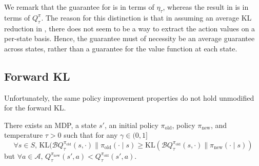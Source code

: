 \documentclass[twoside,11pt]{article}
\newcommand{\actionspace}{\mathcal{A}}
\newcommand{\KL}{\mathrm{KL}}
\newcommand{\boltzmannQ}{\mathcal{B}Q}
\newcommand{\pinew}{{\pi_\mathrm{new}}}
\newcommand{\piold}{{\pi_\mathrm{old}}}
\begin{document}
We remark that the guarantee for  is in terms of $\eta_\tau$, whereas the result in  is in terms of $Q^\pi_\tau$. The reason for this distinction is that in assuming an average KL reduction in , there does not seem to be a way to extract the action values on a per-state basis. Hence, the guarantee must of necessity be an average guarantee across states, rather than a guarantee for the value function at each state. 



\subsection{Forward KL}
Unfortunately, the same policy improvement properties do not hold unmodified for the forward KL. 
\begin{proposition}\label{lem:forward-kl-counterexample}
There exists an MDP, a state $s'$, an initial policy $\piold$, policy $\pinew$, and temperature $\tau > 0$ such that for any $\gamma \in (0, 1]$
\begin{equation*}
    \forall s \in S,\, \KL(\boltzmannQ_\tau^\piold(s, \cdot) \parallel \piold(\cdot \mid s) \geq \KL(\boltzmannQ_\tau^\piold(s, \cdot) \parallel \pinew(\cdot \mid s))
    \end{equation*}
but $\forall a \in \actionspace, \, Q_\tau^\pinew(s', a) < Q_\tau^\piold(s', a)$.
\end{proposition}
\end{document}
